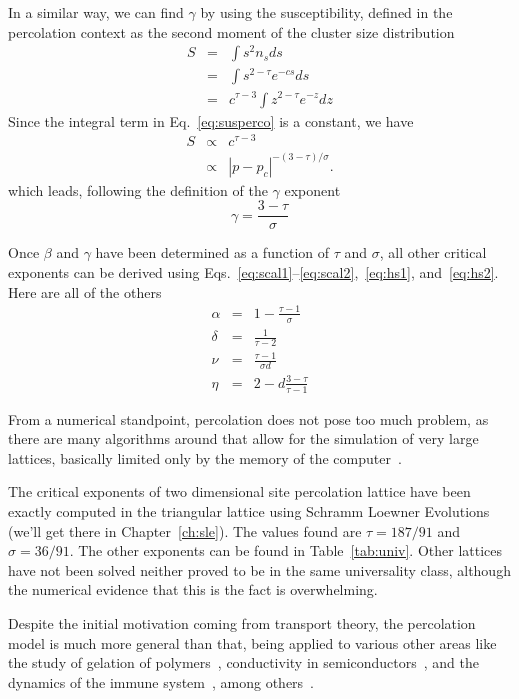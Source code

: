 In a similar way, we can find $\gamma$ by using the susceptibility, defined in
the percolation context as the second moment of the cluster size distribution
\begin{eqnarray}
    S & = & \int s^{2}n_{s}ds\\
      & = & \int s^{2-\tau}e^{-cs}ds\\
      & = & c^{\tau-3}\int z^{2-\tau}e^{-z}dz
    \label{eq:susperco}
\end{eqnarray}
Since the integral term in Eq.~\ref{eq:susperco} is a constant, we have
\begin{eqnarray}
 S & \propto & c^{\tau-3}\\
 & \propto & \left|p-p_{c}\right|^{-\left(3-\tau\right)/\sigma}.
\end{eqnarray}
which leads, following the definition of the $\gamma$ exponent
\begin{equation}
    \gamma=\frac{3-\tau}{\sigma}
\end{equation}

Once $\beta$ and $\gamma$ have been determined as a function of $\tau$ and
$\sigma$, all other critical exponents can be derived using
Eqs.~\ref{eq:scal1}--\ref{eq:scal2},~\ref{eq:hs1}, and~\ref{eq:hs2}. Here
are all of the others
\begin{eqnarray}
    \alpha & = & 1-\frac{\tau-1}{\sigma}\\
    \delta & = & \frac{1}{\tau-2}\\
    \nu    & = & \frac{\tau-1}{\sigma d}\\
    \eta   & = & 2-d\frac{3-\tau}{\tau-1}
\end{eqnarray}

From a numerical standpoint, percolation does not pose too much problem, as
there are many algorithms around that allow for the simulation of very large
lattices, basically limited only by the memory of the
computer~\cite{Newman2000}.

The critical exponents of two dimensional site percolation lattice have been
exactly computed in the triangular lattice using Schramm Loewner
Evolutions~\cite{Smirnov2001} (we'll get there in Chapter~\ref{ch:sle}). The
values found are $\tau=187/91$ and $\sigma=36/91$. The other exponents can be
found in Table~\ref{tab:univ}. Other lattices have not been solved neither
proved to be in the same universality class, although the numerical evidence
that this is the fact is overwhelming.

Despite the initial motivation coming from transport theory, the percolation
model is much more general than that, being applied to various other areas like
the study of gelation of polymers~\cite{DeCandia2005}, conductivity in
semiconductors~\cite{Ambegaokar1971}, and the dynamics of the immune
system~\cite{Stewart1991}, among others~\cite{Sahimi1994}.


